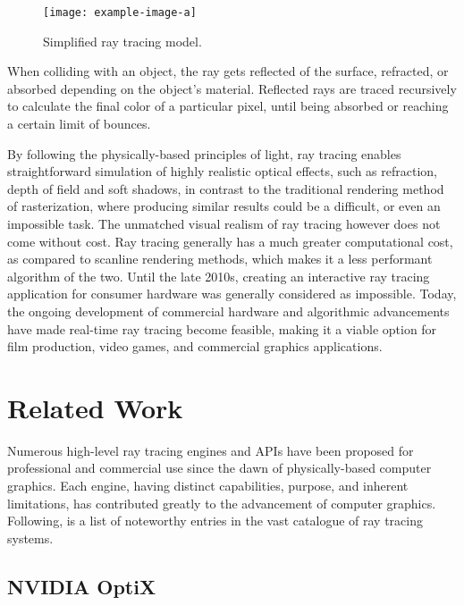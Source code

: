 \vfill
\begin{figure}[!ht]
    \centering
    \texttt{[image: example-image-a]}
    \caption{Simplified ray tracing model.}
    \label{fig:Introduction/RayTracing/rt1}
\end{figure}
\vfill

When colliding with an object, the ray gets reflected of the surface, refracted, or absorbed depending on the object's material. 
Reflected rays are traced recursively to calculate the final color of a particular pixel, until being absorbed or reaching a certain limit of bounces.  

By following the physically-based principles of light, ray tracing enables straightforward simulation of highly realistic optical effects, such as refraction, depth of field and soft shadows, in contrast to the traditional rendering method of rasterization, where producing similar results could be a difficult, or even an impossible task. 
The unmatched visual realism of ray tracing however does not come without cost. 
Ray tracing generally has a much greater computational cost, as compared to scanline rendering methods, which makes it a less performant algorithm of the two.
Until the late 2010s, creating an interactive ray tracing application for consumer hardware was generally considered as impossible.
Today, the ongoing development of commercial hardware and algorithmic advancements have made real-time ray tracing become feasible, making it a viable option for film production, video games, and commercial graphics applications.

\section{Related Work}

Numerous high-level ray tracing engines and APIs have been proposed for professional and commercial use since the dawn of physically-based computer graphics.
Each engine, having distinct capabilities, purpose, and inherent limitations, has contributed greatly to the advancement of computer graphics. 
Following, is a list of noteworthy entries in the vast catalogue of ray tracing systems.

\subsection{NVIDIA OptiX}

